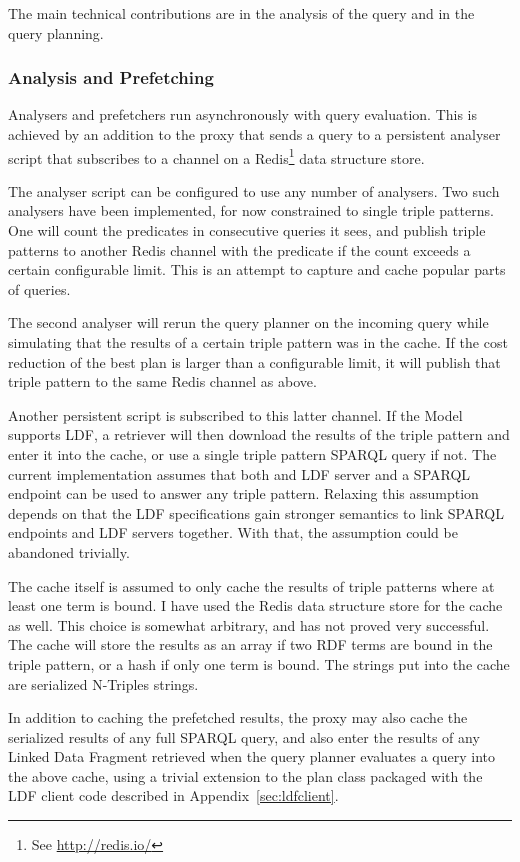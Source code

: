The main technical contributions are in the analysis of the query and
in the query planning.

\subsubsection{Analysis and Prefetching}\label{sec:analpre}

Analysers and prefetchers run asynchronously with query
evaluation. This is achieved by an addition to the proxy that sends a
query to a persistent analyser script that subscribes to a channel on
a Redis\footnote{See \url{http://redis.io/}} data structure store. 

The analyser script can be configured to use any number of analysers.
Two such analysers have been implemented, for now constrained to
single triple patterns. One will count the predicates in consecutive
queries it sees, and publish triple patterns to another Redis channel
with the predicate if the count exceeds a certain configurable
limit. This is an attempt to capture and cache popular parts of
queries.

The second analyser will rerun the query planner on the incoming query
while simulating that the results of a certain triple pattern was in
the cache. If the cost reduction of the best plan is larger than a
configurable limit, it will publish that triple pattern to the same
Redis channel as above. 

Another persistent script is subscribed to this latter channel. If the
Model supports LDF, a retriever will then download
the results of the triple pattern and enter it into the cache, or use
a single triple pattern SPARQL query if not. The current
implementation assumes that both and LDF server and a SPARQL endpoint
can be used to answer any triple pattern. Relaxing this assumption
depends on that the LDF specifications gain stronger semantics to link
SPARQL endpoints and LDF servers together. With that, the assumption
could be abandoned trivially.

The cache itself is assumed to only cache the results of triple
patterns where at least one term is bound. 
I have used the Redis data structure store for the
cache as well. This choice is somewhat arbitrary, and has not proved
very successful. The cache will store the results as an array if two
RDF terms are bound in the triple pattern, or a hash if only one term
is bound. The strings put into the cache are serialized N-Triples
strings.

In addition to caching the prefetched results, the proxy may also
cache the serialized results of any full SPARQL query, and also enter
the results of any Linked Data Fragment retrieved when the query
planner evaluates a query into the above cache, using a trivial
extension to the plan class packaged with the LDF client code
described in Appendix~\ref{sec:ldfclient}.



